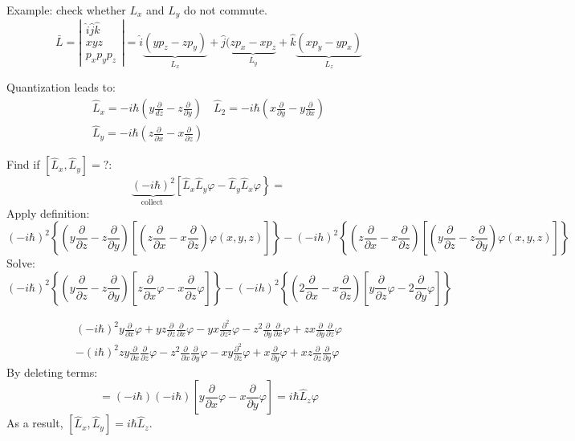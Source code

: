 Example: check whether $L_x$ and $L_y$ do not commute.
$$\bar{L}=\left|\begin{array}{ll}\hat{i} \hat{j} \hat{k} \\ x y z \\ p_{x} p_{y} p_{z}\end{array}\right|=\hat{i} \underbrace{\left(y p_{z}-z p_{y}\right)}_{L_{x}}+\hat{j}(\underbrace{z p_{x}-x p_{z}}_{L_{y}}+\hat{k} \underbrace{\left(x p_{y}-y p_{x}\right)}_{L_{z}}$$

Quantization leads to:
$$\begin{array}{l}
\hat{L}_{x}=-i \hbar\left(y \frac{\partial}{d z}-z \frac{\partial}{\partial y}\right) \quad \hat{L}_{2}=-i \hbar\left(x \frac{\partial}{\partial y}-y \frac{\partial}{\partial x}\right) \\
\hat{L}_{y}=-i \hbar\left(z \frac{\partial}{\partial x}-x \frac{\partial}{\partial z}\right)
\end{array}$$

Find if $\left[\hat{L}_{x}, \hat{L}_{y}\right]=?$:
$$
\underbrace{(-i \hbar)^{2}}_{\text {collect }}\left[\hat{L}_{x} \hat{L}_{y} \varphi-\hat{L}_{y} \hat{L}_{x}\varphi\right\}=
$$
Apply definition:
$$
(-i \hbar)^{2}\left\{\left(y \frac{\partial}{\partial z}-z \frac{\partial}{\partial y}\right)\left[\left(z \frac{\partial}{\partial x}-x \frac{\partial}{\partial z}\right) \varphi(x, y, z)\right]\right\}-(-i h)^{2}\left\{\left(z \frac{\partial}{\partial x}-x \frac{\partial}{\partial z}\right)\left[\left(y \frac{\partial}{\partial z}-z \frac{\partial}{\partial y}\right) \varphi(x, y, z)\right]\right\}
$$
Solve:
$$(-i \hbar)^{2}\left\{\left(y \frac{\partial}{\partial z}-z \frac{\partial}{\partial y}\right)\left[z \frac{\partial}{\partial x} \varphi-x \frac{\partial}{\partial z} \varphi\right]\right\}-(-i h)^{2}\left\{\left(2 \frac{\partial}{\partial x}-x \frac{\partial}{\partial z}\right)\left[y \frac{\partial}{\partial z} \varphi-2 \frac{\partial}{\partial y} \varphi\right]\right\}$$

\begin{multline}
(-i \hbar)^{2}{y \frac{\partial}{\partial x} \varphi+y z \frac{\partial}{\partial z} \frac{\partial}{\partial x} \varphi-y x \frac{\partial^{2}}{\partial z^{2}} \varphi-z^{2} \frac{\partial}{\partial y} \frac{\partial}{\partial x} \varphi+z x \frac{\partial}{\partial y} \frac{\partial}{\partial z} \varphi} \\-(i\hbar)^{2}{z y \frac{\partial}{\partial x} \frac{\partial}{\partial z} \varphi-z^{2} \frac{\partial}{\partial x} \frac{\partial}{\partial y} \varphi-x y \frac{\partial^{2}}{\partial z} \varphi+x \frac{\partial}{\partial y} \varphi+x z \frac{\partial}{\partial z} \frac{\partial}{\partial y} \varphi}
\end{multline}
By deleting terms:
$$=(-i \hbar)(-i \hbar)[y \frac{\partial}{\partial x} \varphi-x\frac{\partial}{\partial y}\varphi] = i\hbar \hat{L}_{z}\varphi$$
As a result, $\left[\hat{L}_{x}, \hat{L}_{y}\right]=i\hbar \hat{L}_{z}$.\\

